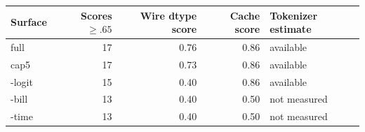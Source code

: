 \begin{tabularx}{\textwidth}{@{}l r r r X@{}}
\toprule
\textbf{Surface} & \textbf{Scores $\geq .65$} & \textbf{Wire dtype score} & \textbf{Cache score} & \textbf{Tokenizer estimate} \\
\midrule
full & 17 & 0.76 & 0.86 & available \\
cap5 & 17 & 0.73 & 0.86 & available \\
-logit & 15 & 0.40 & 0.86 & available \\
-bill & 13 & 0.40 & 0.50 & not measured \\
-time & 13 & 0.40 & 0.50 & not measured \\
\bottomrule
\end{tabularx}
